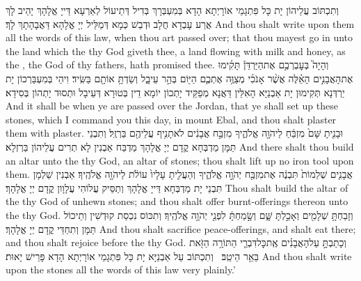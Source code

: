 {וְתִכְתּוֹב עֲלֵיהוֹן יָת כָּל פִּתְגָמֵי אוֹרָיְתָא הָדָא בְּמִעְבְּרָךְ בְּדִיל דְּתֵיעוֹל לְאַרְעָא דַּייָ אֱלָהָךְ יָהֵיב לָךְ אֲרַע עָבְדָא חֲלָב וּדְבַשׁ כְּמָא דְּמַלֵּיל יְיָ אֱלָהָא דַּאֲבָהָתָךְ לָךְ׃}
{And thou shalt write upon them all the words of this law, when thou art passed over; that thou mayest go in unto the land which the \lord\space thy God giveth thee, a land flowing with milk and honey, as the \lord, the God of thy fathers, hath promised thee.}{}
{וְהָיָה֮ בְּעׇבְרְכֶ֣ם אֶת\maqqaf הַיַּרְדֵּן֒ תָּקִ֜ימוּ אֶת\maqqaf הָאֲבָנִ֣ים הָאֵ֗לֶּה אֲשֶׁ֨ר אָנֹכִ֜י מְצַוֶּ֥ה אֶתְכֶ֛ם הַיּ֖וֹם בְּהַ֣ר עֵיבָ֑ל וְשַׂדְתָּ֥ אוֹתָ֖ם בַּשִּֽׂיד׃}
{וִיהֵי בְּמִעְבַּרְכוֹן יָת יַרְדְּנָא תְּקִימוּן יָת אַבְנַיָּא הָאִלֵּין דַּאֲנָא מְפַקֵּיד יָתְכוֹן יוֹמָא דֵין בְּטוּרָא דְּעֵיבָל וּתְסוּד יָתְהוֹן בְּסִידָא׃}
{And it shall be when ye are passed over the Jordan, that ye shall set up these stones, which I command you this day, in mount Ebal, and thou shalt plaster them with plaster.}{}
{וּבָנִ֤יתָ שָּׁם֙ מִזְבֵּ֔חַ לַיהֹוָ֖ה אֱלֹהֶ֑יךָ מִזְבַּ֣ח אֲבָנִ֔ים לֹא\maqqaf תָנִ֥יף עֲלֵיהֶ֖ם בַּרְזֶֽל׃}
{וְתִבְנֵי תַּמָּן מַדְבְּחָא קֳדָם יְיָ אֱלָהָךְ מַדְבַּח אַבְנִין לָא תְרִים עֲלֵיהוֹן בַּרְזְלָא׃}
{And there shalt thou build an altar unto the \lord\space thy God, an altar of stones; thou shalt lift up no iron tool upon them.}{}
{אֲבָנִ֤ים שְׁלֵמוֹת֙ תִּבְנֶ֔ה אֶת\maqqaf מִזְבַּ֖ח יְהֹוָ֣ה אֱלֹהֶ֑יךָ וְהַעֲלִ֤יתָ עָלָיו֙ עוֹלֹ֔ת לַיהֹוָ֖ה אֱלֹהֶֽיךָ׃}
{אַבְנִין שַׁלְמָן תִּבְנֵי יָת מַדְבְּחָא דַּייָ אֱלָהָךְ וְתַסֵּיק עֲלוֹהִי עֲלָוָון קֳדָם יְיָ אֱלָהָךְ׃}
{Thou shalt build the altar of the \lord\space thy God of unhewn stones; and thou shalt offer burnt-offerings thereon unto the \lord\space thy God.}{}
{וְזָבַחְתָּ֥ שְׁלָמִ֖ים וְאָכַ֣לְתָּ שָּׁ֑ם וְשָׂ֣מַחְתָּ֔ לִפְנֵ֖י יְהֹוָ֥ה אֱלֹהֶֽיךָ׃}
{וְתִכּוֹס נִכְסַת קוּדְשִׁין וְתֵיכוֹל תַּמָּן וְתִחְדֵּי קֳדָם יְיָ אֱלָהָךְ׃}
{And thou shalt sacrifice peace-offerings, and shalt eat there; and thou shalt rejoice before the \lord\space thy God.}{}
{וְכָתַבְתָּ֣ עַל\maqqaf הָאֲבָנִ֗ים אֶֽת\maqqaf כׇּל\maqqaf דִּבְרֵ֛י הַתּוֹרָ֥ה הַזֹּ֖את בַּאֵ֥ר הֵיטֵֽב׃ \setuma }
{וְתִכְתּוֹב עַל אַבְנַיָּא יָת כָּל פִּתְגָמֵי אוֹרָיְתָא הָדָא פָּרֵישׁ יָאוּת׃}
{And thou shalt write upon the stones all the words of this law very plainly.’}{}
